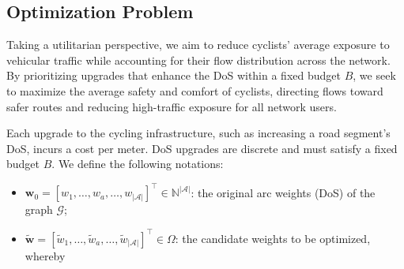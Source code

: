 \documentclass[letterpaper, 10 pt, conference]{ieeeconf}  %
\begin{document}


\subsection{Optimization Problem}
\label{optimization_problem}
Taking a utilitarian perspective, we aim to reduce cyclists' average exposure to vehicular traffic while accounting for their flow distribution across the network. By prioritizing upgrades that enhance the DoS within a fixed budget $B$, we seek to maximize the average safety and comfort of cyclists, directing flows toward safer routes and reducing high-traffic exposure for all network users.

Each upgrade to the cycling infrastructure, such as increasing a road segment’s DoS, incurs a cost per meter. DoS upgrades are discrete and must satisfy a fixed budget $B$. We define the following notations:

\begin{itemize}
    \item $\mathbf{w}_{0} = \left [ w_{1}, \ldots, w_{a}, \ldots, w_{|\mathcal{A}|} \right ]^\top \in \mathbb{N}^{|\mathcal{A}|}$: the original arc weights (DoS) of the graph $\mathcal{G}$;
    \item $\tilde{\mathbf{w}} = \left [ \tilde{w}_{1}, \ldots, \tilde{w}_{a}, \ldots, \tilde{w}_{|\mathcal{A}|} \right ]^\top \in \Omega$: the candidate weights to be optimized, whereby
\end{itemize}
\end{document}
